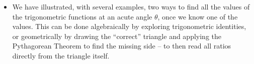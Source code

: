 \documentclass{ximera}
\begin{document}

\begin{summary}\begin{itemize}
\item We have illustrated, with several examples, two ways to find all the values of the trigonometric functions at an acute angle $\theta$, once we know one of the values. This can be done algebraically by exploring trigonometric identities, or geometrically by drawing the ``correct'' triangle and applying the Pythagorean Theorem to find the missing side -- to then read all ratios directly from the triangle itself.
\end{itemize}\end{summary}
\end{document}

